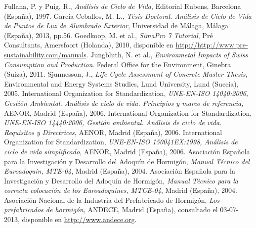 % 
\begin{thebibliography}{100}
Fullana, P. y Puig, R., \emph{Análisis de Ciclo de Vida}, Editorial Rubens, Barcelona (España), 1997.
García Ceballos, M. L., \emph{Tésis Doctoral. Análisis de Ciclo de Vida de Puntos de Luz de Alumbrado Exterior}, Universidad de Málaga, Málaga (España), 2013, pp.56.
Goedkoop, M. et al., \emph{SimaPro 7 Tutorial}, Pré Consultants, Amersfoort (Holanda), 2010, disponible en \url{http://http://www.pre-sustainability.com/manuals}.
Jungbluth, N. et al., \emph{Environmetal Impacts of Swiss Consumption and Production}. Federal Office for the Environment, Ginebra (Suiza), 2011.
Sjunnesson, J., \emph{Life Cycle Assessment of Concrete Master Thesis}, Environmental and Energy Systems Studies, Lund University, Lund (Suecia), 2005.
International Organization for Standardization, \emph{UNE-EN-ISO 14040:2006, Gestión Ambiental. Análisis de ciclo de vida. Principios y marco de referencia}, AENOR, Madrid (España), 2006.
International Organization for Standardization, \emph{UNE-EN-ISO 14440:2006, Gestión ambiental. Análisis de ciclo de vida. Requisitos y Directrices}, AENOR, Madrid (España), 2006.
International Organization for Standardization, \emph{UNE-EN-ISO 150041EX:1998, Análisis de ciclo de vida simplificado}, AENOR, Madrid (España), 2006.
Asociación Española para la Investigación y Desarrollo del Adoquín de Hormigón, \emph{Manual Técnico del Euroadoquín, MTE-04}, Madrid (España), 2004.
Asociación Española para la Investigación y Desarrollo del Adoquín de Hormigón, \emph{Manual Técnico para la correcta colocación de los Euroadoquines, MTCE-04}, Madrid (España), 2004.
Asociación Nacional de la Industria del Prefabricado de Hormigón, \emph{Los prefabricados de hormigón}, ANDECE, Madrid (España), consultado el 03-07-2013, disponible en \url{http://www.andece.org}.
\end{thebibliography}
